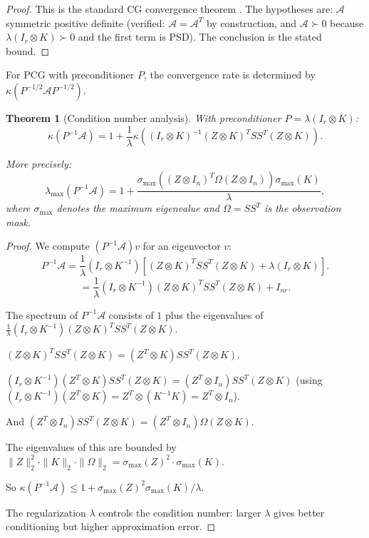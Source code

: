 \documentclass[12pt]{article}
\newtheorem{theorem}{Theorem}
\begin{document}
\begin{proof}
This is the standard CG convergence theorem \cite[Theorem 6.29]{Trefethen1997}. The hypotheses are: $\mathcal{A}$ symmetric positive definite (verified: $\mathcal{A} = \mathcal{A}^T$ by construction, and $\mathcal{A} \succ 0$ because $\lambda(I_r \otimes K) \succ 0$ and the first term is PSD). The conclusion is the stated bound.
\end{proof}

For PCG with preconditioner $P$, the convergence rate is determined by $\kappa(P^{-1/2}\mathcal{A}P^{-1/2})$.

\begin{theorem}[Condition number analysis]\label{thm:cond}
With preconditioner $P = \lambda(I_r \otimes K)$:
\[
\kappa(P^{-1}\mathcal{A}) = 1 + \frac{1}{\lambda} \kappa\left((I_r \otimes K)^{-1} (Z\otimes K)^T SS^T (Z\otimes K)\right).
\]

More precisely:
\[
\lambda_{\max}(P^{-1}\mathcal{A}) = 1 + \frac{\sigma_{\max}((Z \otimes I_n)^T \Omega (Z \otimes I_n)) \sigma_{\max}(K)}{\lambda},
\]
where $\sigma_{\max}$ denotes the maximum eigenvalue and $\Omega = SS^T$ is the observation mask.
\end{theorem}

\begin{proof}
We compute $(P^{-1}\mathcal{A})v$ for an eigenvector $v$:
\[
P^{-1}\mathcal{A} = \frac{1}{\lambda}(I_r \otimes K^{-1})\left[(Z\otimes K)^T SS^T (Z\otimes K) + \lambda(I_r \otimes K)\right].
\]
\[
= \frac{1}{\lambda}(I_r \otimes K^{-1})(Z\otimes K)^T SS^T (Z\otimes K) + I_{nr}.
\]

The spectrum of $P^{-1}\mathcal{A}$ consists of $1$ plus the eigenvalues of $\frac{1}{\lambda}(I_r\otimes K^{-1})(Z\otimes K)^T SS^T (Z\otimes K)$.

$(Z\otimes K)^T SS^T(Z\otimes K) = (Z^T \otimes K)SS^T(Z \otimes K)$.

$(I_r \otimes K^{-1})(Z^T\otimes K) SS^T (Z\otimes K) = (Z^T \otimes I_n) SS^T (Z\otimes K)$
(using $(I_r\otimes K^{-1})(Z^T\otimes K) = Z^T \otimes (K^{-1}K) = Z^T \otimes I_n$).

And $(Z^T\otimes I_n)SS^T(Z\otimes K) = (Z^T\otimes I_n)\Omega(Z\otimes K)$.

The eigenvalues of this are bounded by $\|Z\|_2^2 \cdot \|K\|_2 \cdot \|\Omega\|_2 = \sigma_{\max}(Z)^2 \cdot \sigma_{\max}(K)$.

So $\kappa(P^{-1}\mathcal{A}) \leq 1 + \sigma_{\max}(Z)^2 \sigma_{\max}(K)/\lambda$.

The regularization $\lambda$ controls the condition number: larger $\lambda$ gives better conditioning but higher approximation error.
\end{proof}
\end{document}
